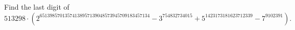 Find the last digit of
\[513298\cdot\left(2^{65139857013574138957139048573945709183457134}-3^{754832734015}+5^{1423173181623712339}-7^{9102391}\right).\]
